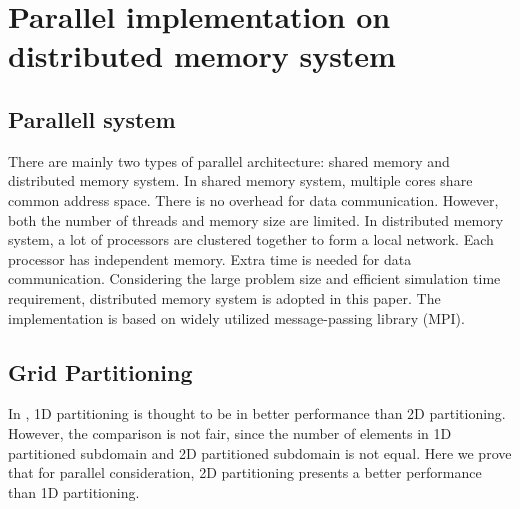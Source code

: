 \documentclass{sig-alternate}
\begin{document}
\begin{comment}
	Besides, SOR, PCG, MG (multigrid) methods can be combined with ASM to accelerate convergence. However, there are limitations of 
	the resulting
	methods. In SOR method, $\omega$ is used to accelerate convergence. However, the optimal $w$ value depends on system matrix 
	eigenvalues. It is hard to choose the optimal $\omegaw$ for large
	size problem, and a bad $\omega$ value can even lead to divergence; MG may have
	error or even convergence problem, especially for 3D irregular grid; In PCG, a global
	matrix is required, hence the maximum problem size that can be solved is limited.
\end{comment}
\section{Parallel implementation on \\distributed memory system}
  \subsection{Parallell system}
	There are mainly two types of parallel architecture: shared memory and distributed memory system. In shared 
	memory system, 
	multiple cores share common address space. There is no overhead for data communication. However, both the number
	of threads and memory size are limited. In distributed 
	memory system, a lot of processors are clustered together to form a local network. Each processor has independent memory. 
	Extra time is needed for data communication. Considering the large problem 
	size and efficient simulation time requirement, distributed memory system is adopted in this paper. The implementation is based
	on widely utilized message-passing library (MPI).
  \subsection{Grid Partitioning}
	In \cite{Zhongyu}, 1D partitioning is thought to be in better performance than 2D partitioning. However, the comparison is not 
	fair, since the number of elements in 1D partitioned subdomain and 2D partitioned subdomain is not equal. Here we prove that
	for parallel consideration, 2D partitioning presents a better performance than 1D partitioning. 
\end{document}
